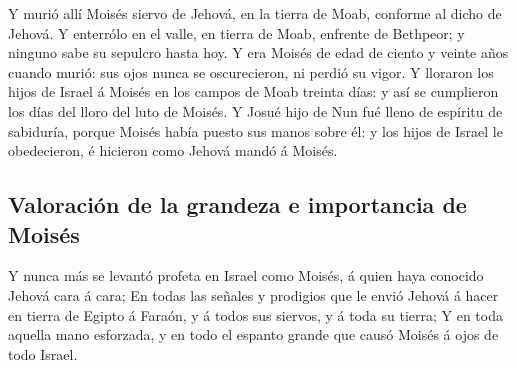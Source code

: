  Y murió allí Moisés siervo de Jehová, en la tierra de Moab,
conforme al dicho de Jehová.  Y enterrólo en el valle, en
tierra de Moab, enfrente de Bethpeor; y ninguno sabe su sepulcro hasta
hoy.  Y era Moisés de edad de ciento y veinte años cuando
murió: sus ojos nunca se oscurecieron, ni perdió su vigor. 
Y lloraron los hijos de Israel á Moisés en los campos de Moab treinta
días: y así se cumplieron los días del lloro del luto de Moisés.
 Y Josué hijo de Nun fué lleno de espíritu de sabiduría,
porque Moisés había puesto sus manos sobre él: y los hijos de Israel le
obedecieron, é hicieron como Jehová mandó á Moisés.

\hypertarget{valoraciuxf3n-de-la-grandeza-e-importancia-de-moisuxe9s}{%
\subsection{Valoración de la grandeza e importancia de
Moisés}\label{valoraciuxf3n-de-la-grandeza-e-importancia-de-moisuxe9s}}

 Y nunca más se levantó profeta en Israel como Moisés, á
quien haya conocido Jehová cara á cara;  En todas las
señales y prodigios que le envió Jehová á hacer en tierra de Egipto á
Faraón, y á todos sus siervos, y á toda su tierra;  Y en
toda aquella mano esforzada, y en todo el espanto grande que causó
Moisés á ojos de todo Israel.
